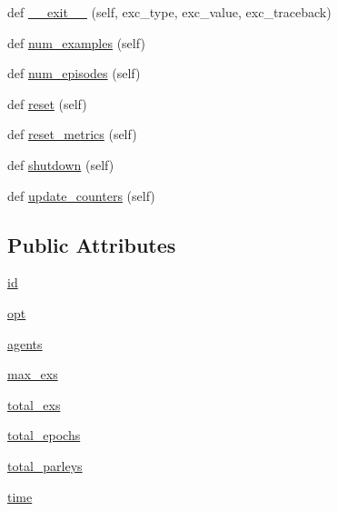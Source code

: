 \begin{DoxyCompactItemize}
\item 
def \hyperlink{classparlai_1_1core_1_1worlds_1_1World_ae2b8ea006564cbefbe8520f45fb71040}{\+\_\+\+\_\+exit\+\_\+\+\_\+} (self, exc\+\_\+type, exc\+\_\+value, exc\+\_\+traceback)
\item 
def \hyperlink{classparlai_1_1core_1_1worlds_1_1World_a0402b615564d760fac542b8c5a504be5}{num\+\_\+examples} (self)
\item 
def \hyperlink{classparlai_1_1core_1_1worlds_1_1World_a7c7258c4ad6a6bdfc76287832876a25d}{num\+\_\+episodes} (self)
\item 
def \hyperlink{classparlai_1_1core_1_1worlds_1_1World_a363cc32add41645e1ba405808fafb5b4}{reset} (self)
\item 
def \hyperlink{classparlai_1_1core_1_1worlds_1_1World_af26e2aacab6282f8ef19f278d638adea}{reset\+\_\+metrics} (self)
\item 
def \hyperlink{classparlai_1_1core_1_1worlds_1_1World_a7e7e5a27569323dd334b87df6fef31e6}{shutdown} (self)
\item 
def \hyperlink{classparlai_1_1core_1_1worlds_1_1World_a77730e92a331274ab7b6ea3e7b99d1a4}{update\+\_\+counters} (self)
\end{DoxyCompactItemize}
\subsection*{Public Attributes}
\begin{DoxyCompactItemize}
\item 
\hyperlink{classparlai_1_1core_1_1worlds_1_1World_a568184e1c2ccaff10d9a0b69ecb8115a}{id}
\item 
\hyperlink{classparlai_1_1core_1_1worlds_1_1World_a3640d92718acd3e6942a28c1ab3678bd}{opt}
\item 
\hyperlink{classparlai_1_1core_1_1worlds_1_1World_a728f75194cc26ea4035047c46cf62608}{agents}
\item 
\hyperlink{classparlai_1_1core_1_1worlds_1_1World_a1fd36ad5eb83d8ac70bd20c0b3752b37}{max\+\_\+exs}
\item 
\hyperlink{classparlai_1_1core_1_1worlds_1_1World_acadde6b5d84d54b912aab56ec38d24dd}{total\+\_\+exs}
\item 
\hyperlink{classparlai_1_1core_1_1worlds_1_1World_a296f0478da2696d33dde49adb135fa17}{total\+\_\+epochs}
\item 
\hyperlink{classparlai_1_1core_1_1worlds_1_1World_ac23951eebe5c495ab2c79e57c960d681}{total\+\_\+parleys}
\item 
\hyperlink{classparlai_1_1core_1_1worlds_1_1World_a3246107ea5a86b97cef9164286b39925}{time}
\end{DoxyCompactItemize}


